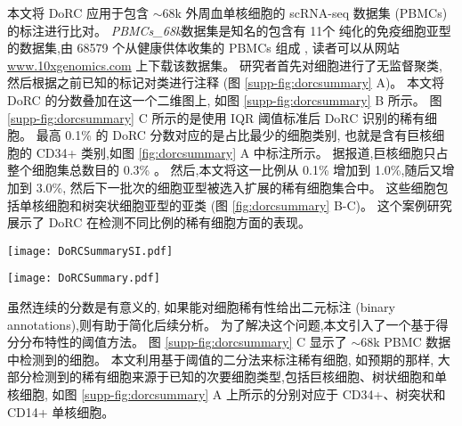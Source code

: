 本文将 DoRC 应用于包含 ${\sim}68$k 外周血单核细胞的 scRNA-seq 数据集 (PBMCs) 的标注进行比对。
 \textit{PBMCs\_68k}数据集是知名的包含有 11个 纯化的免疫细胞亚型的数据集,由 68579 个从健康供体收集的 PBMCs 组成 ,
读者可以从网站 \url{www.10xgenomics.com} 上下载该数据集。
研究者首先对细胞进行了无监督聚类,
然后根据之前已知的标记对类进行注释 (图 \ref{supp-fig:dorcsummary} A)。
本文将 DoRC 的分数叠加在这一个二维图上, 如图 \ref{supp-fig:dorcsummary} B 所示。
图 \ref{supp-fig:dorcsummary} C 所示的是使用 IQR 阈值标准后 DoRC 识别的稀有细胞。
最高 0.1\% 的 DoRC 分数对应的是占比最少的细胞类别, 
也就是含有巨核细胞的 CD34+ 类别,如图 \ref{fig:dorcsummary} A 中标注所示。
据报道,巨核细胞只占整个细胞集总数目的 0.3\% 。
然后,本文将这一比例从 0.1\% 增加到 1.0\%,随后又增加到 3.0\%,
然后下一批次的细胞亚型被选入扩展的稀有细胞集合中。
这些细胞包括单核细胞和树突状细胞亚型的亚类 (图 \ref{fig:dorcsummary} B-C)。
这个案例研究展示了 DoRC 在检测不同比例的稀有细胞方面的表现。

\begin{figure*}[!htbp]
    \centering
    \texttt{[image: DoRCSummarySI.pdf]}
    \caption{
    DoRC 在 PBMCs\_68k 上的性能评估
    }
    \label{supp-fig:dorcsummary}
\end{figure*}

\begin{figure*}[!htbp]
    \centering
    \texttt{[image: DoRCSummary.pdf]}
    \caption{
    DoRC 发现了不同稀有度的细胞    
    }
    \label{fig:dorcsummary}
\end{figure*}

虽然连续的分数是有意义的,
如果能对细胞稀有性给出二元标注 (binary annotations),则有助于简化后续分析。
为了解决这个问题,本文引入了一个基于得分分布特性的阈值方法。
图 \ref{supp-fig:dorcsummary} C 显示了 ${\sim}68$k PBMC 数据中检测到的细胞。
本文利用基于阈值的二分法来标注稀有细胞,
如预期的那样,
大部分检测到的稀有细胞来源于已知的次要细胞类型,包括巨核细胞、树状细胞和单核细胞,
如图 \ref{supp-fig:dorcsummary} A 上所示的分别对应于 CD34+、树突状和 CD14+ 单核细胞。


